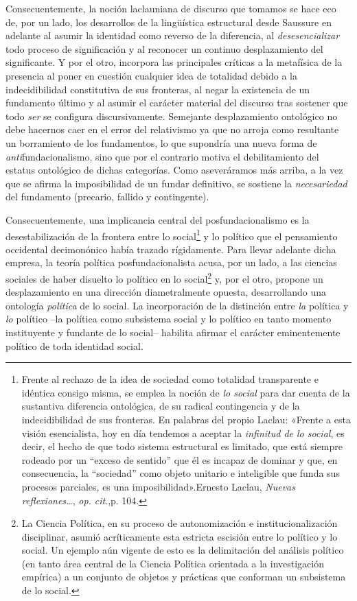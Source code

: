 Consecuentemente, la noción laclauniana de discurso que tomamos se hace eco de, por un lado, los desarrollos de la lingüística estructural desde Saussure en adelante al asumir la identidad como reverso de la diferencia, al \emph{desesencializar} todo proceso de significación y al reconocer un continuo desplazamiento del significante. Y por el otro, incorpora las principales críticas a la metafísica de la presencia al poner en cuestión cualquier idea de totalidad debido a la indecidibilidad constitutiva de sus fronteras, al negar la existencia de un fundamento último y al asumir el carácter material del discurso tras sostener que todo \emph{ser} se configura discursivamente. Semejante desplazamiento ontológico no debe hacernos caer en el error del relativismo ya que no arroja como resultante un borramiento de los fundamentos, lo que supondría una nueva forma de \emph{anti}fundacionalismo, sino que por el contrario motiva el debilitamiento del estatus ontológico de dichas categorías. Como aseveráramos más arriba, a la vez que se afirma la imposibilidad de un fundar definitivo, se sostiene la \emph{necesariedad} del fundamento (precario, fallido y contingente).

Consecuentemente, una implicancia central del posfundacionalismo es la desestabilización de la frontera entre lo social\footnote{Frente al rechazo de la idea de sociedad como totalidad transparente e idéntica consigo misma, se emplea la noción de \emph{lo social} para dar cuenta de la sustantiva diferencia ontológica, de su radical contingencia y de la indecidibilidad de sus fronteras. En palabras del propio Laclau: «Frente a esta visión esencialista, hoy en día tendemos a aceptar la \emph{infinitud de lo social}, es decir, el hecho de que todo sistema estructural es limitado, que está siempre rodeado por un ``exceso de sentido'' que él es incapaz de dominar y que, en consecuencia, la ``sociedad'' como objeto unitario e inteligible que funda sus procesos parciales, es una imposibilidad».Ernesto Laclau, \emph{Nuevas reflexiones\ldots{}}, \emph{op. cit}.,p. 104.} y lo político que el pensamiento occidental decimonónico había trazado rígidamente. Para llevar adelante dicha empresa, la teoría política posfundacionalista acusa, por un lado, a las ciencias sociales de haber disuelto lo político en lo social\footnote{La Ciencia Política, en su proceso de autonomización e institucionalización disciplinar, asumió acríticamente esta estricta escisión entre lo político y lo social. Un ejemplo aún vigente de esto es la delimitación del análisis político (en tanto área central de la Ciencia Política orientada a la investigación empírica) a un conjunto de objetos y prácticas que conforman un subsistema de lo social.} y, por el otro, propone un desplazamiento en una dirección diametralmente opuesta, desarrollando una ontología \emph{política} de lo social. La incorporación de la distinción entre \emph{la} política y \emph{lo} político --la política como subsistema social y lo político en tanto momento instituyente y fundante de lo social-- habilita afirmar el carácter eminentemente político de toda identidad social.

